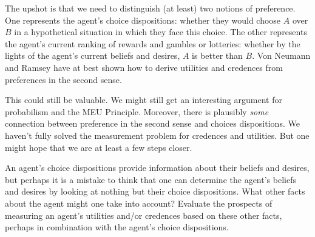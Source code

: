 The upshot is that we need to distinguish (at least) two notions of preference.
One represents the agent's choice dispositions: whether they would choose $A$
over $B$ in a hypothetical situation in which they face this choice. The other
represents the agent's current ranking of rewards and gambles or lotteries:
whether by the lights of the agent's current beliefs and desires, $A$ is better
than $B$. Von Neumann and Ramsey have at best shown how to derive utilities and
credences from preferences in the second sense.

This could still be valuable. We might still get an interesting argument for
probabilism and the MEU Principle. Moreover, there is plausibly \emph{some}
connection between preference in the second sense and choices dispositions. We
haven't fully solved the measurement problem for credences and utilities. But
one might hope that we are at least a few steps closer.



\begin{essay}
  An agent's choice dispositions provide information about their beliefs and
  desires, but perhaps it is a mistake to think that one can determine the
  agent's beliefs and desires by looking at nothing but their choice
  dispositions. What other facts about the agent might one take into account?
  Evaluate the prospects of measuring an agent's utilities and/or credences
  based on these other facts, perhaps in combination with the agent's choice
  dispositions.
\end{essay}

